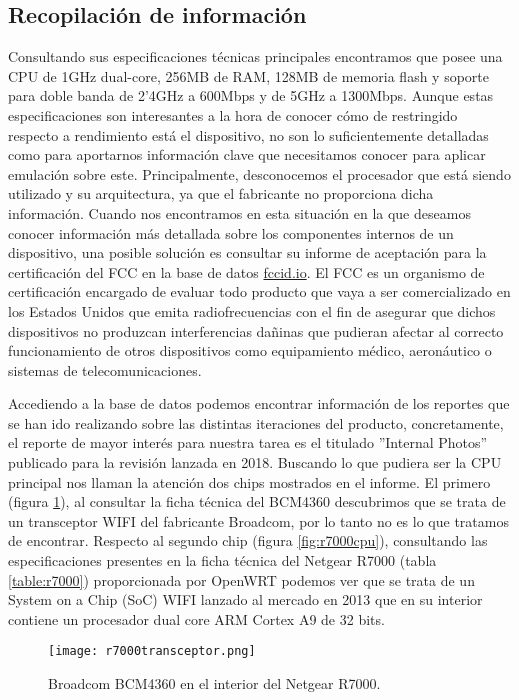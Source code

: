\subsection{Recopilación de información}\label{r7000_section}
Consultando sus especificaciones técnicas principales 
encontramos que posee una CPU de 1GHz dual-core, 256MB de RAM, 128MB de memoria flash y soporte para doble banda de 2'4GHz a 600Mbps y de 5GHz a 
1300Mbps. Aunque estas especificaciones son interesantes a la hora de conocer cómo de restringido respecto a rendimiento está el dispositivo,
no son lo suficientemente detalladas como para aportarnos información clave que necesitamos conocer para aplicar emulación sobre este.
Principalmente, desconocemos el procesador que está siendo utilizado y su arquitectura, ya que el fabricante no proporciona dicha información.
Cuando nos encontramos en esta situación en la que deseamos conocer información más detallada sobre los componentes internos de un dispositivo, 
una posible solución es consultar su informe de aceptación para la certificación del FCC\cite{fcc} en la base de datos \hyperlink{fccid.io}{fccid.io}.
El FCC es un organismo de certificación encargado de evaluar todo producto que vaya a ser comercializado en los Estados Unidos que emita 
radiofrecuencias con el fin de asegurar que dichos dispositivos no produzcan interferencias dañinas que pudieran afectar al correcto
funcionamiento de otros dispositivos como equipamiento médico, aeronáutico o sistemas de telecomunicaciones.

Accediendo a la base de datos podemos encontrar información de los reportes que se han ido realizando sobre las distintas iteraciones del producto,
concretamente, el reporte de mayor interés para nuestra tarea es el titulado ''Internal Photos'' publicado para la revisión lanzada en 2018\cite{netgearFCCid}.
Buscando lo que pudiera ser la CPU principal nos llaman la atención dos chips mostrados en el informe. El primero (figura \ref{fig:r7000transceptor}), al 
consultar la ficha técnica del BCM4360 descubrimos que se trata de un transceptor WIFI del fabricante Broadcom, por lo tanto no es lo que tratamos de 
encontrar. Respecto al segundo chip (figura \ref{fig:r7000cpu}), consultando las especificaciones presentes en la ficha técnica del Netgear R7000 
(tabla \ref{table:r7000}) proporcionada por OpenWRT podemos ver que se trata de un System on a Chip (SoC) WIFI lanzado al mercado en 2013\cite{broadcomSOCs} 
que en su interior contiene un procesador dual core ARM Cortex A9 de 32 bits.

\begin{figure}[H]
    \centering
    \texttt{[image: r7000transceptor.png]}
    \caption{Broadcom BCM4360 en el interior del Netgear R7000.\cite{netgearFCCid}}
    \label{fig:r7000transceptor}
\end{figure}

